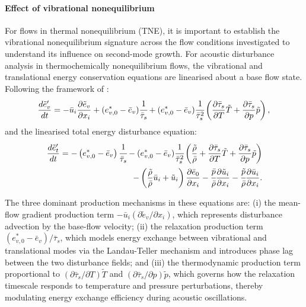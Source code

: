 \paragraph{Effect of vibrational nonequilibrium}

For flows in thermal nonequilibrium (\gls{TNE}), it is important to establish the vibrational nonequilibrium signature across the flow conditions investigated to understand its influence on second-mode growth. For acoustic disturbance analysis in thermochemically nonequilibrium flows, the vibrational and translational energy conservation equations are linearised about a base flow state. Following the framework of \citet{WagnildEtAl2012}:
\begin{equation}\label{equation:vibrational_disturbance}
\frac{d\tilde{e}_v'}{dt} = -\bar{u}_i \frac{\partial \tilde{e}_{v}}{\partial x_i} + (e_{v,0}^* - \bar{e}_v) \cfrac{1}{\bar{\tau}_{s}} + (e_{v,0}^* - \bar{e}_v) \cfrac{1}{\bar{\tau}_{s}^2} \left( \frac{\partial \bar{\tau}_s}{\partial T} \tilde{T} + \frac{\partial \bar{\tau}_s}{\partial p} \tilde{p} \right),
\end{equation}
and the linearised total energy disturbance equation:
\begin{equation}\label{equation:translational_disturbance}
\begin{split}
\frac{d\tilde{e}_t'}{dt} = -\left(e_{v,0}^* - \bar{e}_v\right) \cfrac{1}{\bar{\tau}_{s}} - (e_{v,0}^* - \bar{e}_v) \cfrac{1}{\bar{\tau}_{s}^2} \left( \frac{\tilde{\rho}}{\bar{\rho}} + \frac{\partial \bar{\tau}_s}{\partial T} \tilde{T} + \frac{\partial \bar{\tau}_s}{\partial p} \tilde{p} \right) \\
- \left( \frac{\tilde{\rho}}{\bar{\rho}} \bar{u}_{i} + \tilde{u}_i \right) \frac{\partial \bar{e}_0}{\partial x_i} - \cfrac{\bar{p}}{\bar{\rho}} \frac{\partial \tilde{u}_i}{\partial x_i} - \cfrac{\tilde{p}}{\bar{\rho}} \frac{\partial \bar{u}_{i}}{\partial x_i}.
\end{split}
\end{equation}

The three dominant production mechanisms in these equations are: (i) the mean-flow gradient production term $-\bar{u}_i (\partial \tilde{e}_{v}/\partial x_i)$, which represents disturbance advection by the base-flow velocity; (ii) the relaxation production term $(e_{v,0}^* - \bar{e}_v)/\bar{\tau}_s$, which models energy exchange between vibrational and translational modes via the Landau-Teller mechanism and introduces phase lag between the two disturbance fields; and (iii) the thermodynamic production term proportional to $(\partial \bar{\tau}_s/\partial T) \tilde{T}$ and $(\partial \bar{\tau}_s/\partial p) \tilde{p}$, which governs how the relaxation timescale responds to temperature and pressure perturbations, thereby modulating energy exchange efficiency during acoustic oscillations.

